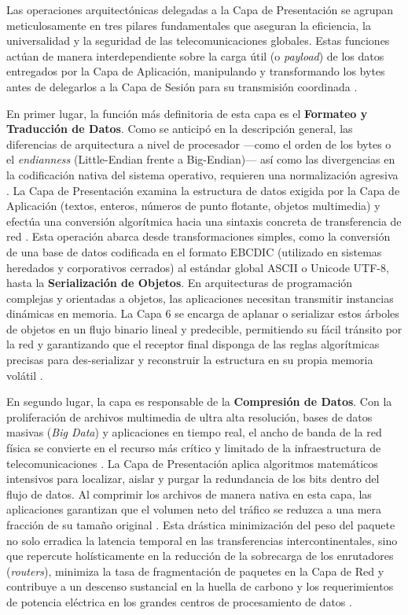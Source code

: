 \documentclass[a4paper,12pt]{article}
\begin{document}
Las operaciones arquitectónicas delegadas a la Capa de Presentación se agrupan meticulosamente en tres pilares fundamentales que aseguran la eficiencia, la universalidad y la seguridad de las telecomunicaciones globales. Estas funciones actúan de manera interdependiente sobre la carga útil (o \textit{payload}) de los datos entregados por la Capa de Aplicación, manipulando y transformando los bytes antes de delegarlos a la Capa de Sesión para su transmisión coordinada \cite{ibm_osi_layer6, ionos_pres}.

En primer lugar, la función más definitoria de esta capa es el \textbf{Formateo y Traducción de Datos}. Como se anticipó en la descripción general, las diferencias de arquitectura a nivel de procesador —como el orden de los bytes o el \textit{endianness} (Little-Endian frente a Big-Endian)— así como las divergencias en la codificación nativa del sistema operativo, requieren una normalización agresiva \cite{uazuay_pres}. La Capa de Presentación examina la estructura de datos exigida por la Capa de Aplicación (textos, enteros, números de punto flotante, objetos multimedia) y efectúa una conversión algorítmica hacia una sintaxis concreta de transferencia de red \cite{ionos_pres}. Esta operación abarca desde transformaciones simples, como la conversión de una base de datos codificada en el formato EBCDIC (utilizado en sistemas heredados y corporativos cerrados) al estándar global ASCII o Unicode UTF-8, hasta la \textbf{Serialización de Objetos}. En arquitecturas de programación complejas y orientadas a objetos, las aplicaciones necesitan transmitir instancias dinámicas en memoria. La Capa 6 se encarga de aplanar o serializar estos árboles de objetos en un flujo binario lineal y predecible, permitiendo su fácil tránsito por la red y garantizando que el receptor final disponga de las reglas algorítmicas precisas para des-serializar y reconstruir la estructura en su propia memoria volátil \cite{ionos_pres}.

En segundo lugar, la capa es responsable de la \textbf{Compresión de Datos}. Con la proliferación de archivos multimedia de ultra alta resolución, bases de datos masivas (\textit{Big Data}) y aplicaciones en tiempo real, el ancho de banda de la red física se convierte en el recurso más crítico y limitado de la infraestructura de telecomunicaciones \cite{pure_comp}. La Capa de Presentación aplica algoritmos matemáticos intensivos para localizar, aislar y purgar la redundancia de los bits dentro del flujo de datos. Al comprimir los archivos de manera nativa en esta capa, las aplicaciones garantizan que el volumen neto del tráfico se reduzca a una mera fracción de su tamaño original \cite{ibm_osi_layer6}. Esta drástica minimización del peso del paquete no solo erradica la latencia temporal en las transferencias intercontinentales, sino que repercute holísticamente en la reducción de la sobrecarga de los enrutadores (\textit{routers}), minimiza la tasa de fragmentación de paquetes en la Capa de Red y contribuye a un descenso sustancial en la huella de carbono y los requerimientos de potencia eléctrica en los grandes centros de procesamiento de datos \cite{pure_comp, actian_comp}.
\end{document}
